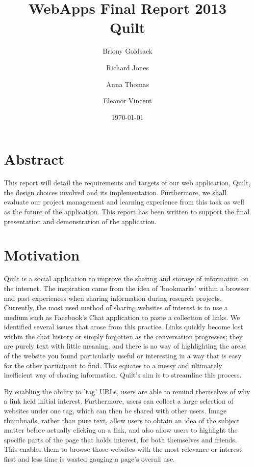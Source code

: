 \documentclass[a4wide, 10pt]{article}
\begin{document}
\title{WebApps Final Report 2013 \\
       Quilt}
\author{Briony Goldsack \and Richard Jones \and Anna Thomas \and Eleanor Vincent}
\date{\today}         
\maketitle            

\section{Abstract}

This report will detail the requirements and targets of our web application, Quilt, the design choices involved and its implementation. Furthermore, we shall evaluate our project management and learning experience from this task as well as the future of the application. This report has been written to support the final presentation and demonstration of the application.

\section{Motivation} 
Quilt is a social application to improve the sharing and storage of information on the internet. The inspiration came from the idea of 'bookmarks' within a browser and past experiences when sharing information during research projects. Currently, the most used method of sharing websites of interest is to use a medium such as Facebook's Chat application to paste a collection of links. We identified several issues that arose from this practice. Links quickly become lost within the chat history or simply forgotten as the conversation progresses; they are purely text with little meaning, and there is no way of highlighting the areas of the website you found particularly useful or interesting in a way that is easy for the other participant to find. This equates to a messy and ultimately inefficient way of sharing information. Quilt's aim is to streamline this process. 

By enabling the ability to 'tag' URLs, users are able to remind themselves of why a link held initial interest. Furthermore, users can collect a large selection of websites under one tag, which can then be shared with other users. Image thumbnails, rather than pure text, allow users to obtain an idea of the subject matter before actually clicking on a link, and also allow users to highlight the specific parts of the page that holds interest, for both themselves and friends. This enables them to browse those websites with the most relevance or interest first and less time is wasted gauging a page's overall use. 
\end{document}
